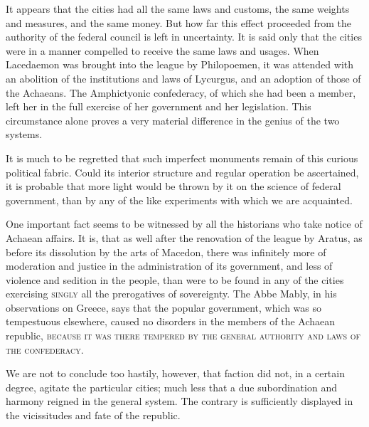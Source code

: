 It appears that the cities had all the same laws and customs, the same weights and measures, and the same money. 
But how far this effect proceeded from the authority of the federal council is left in uncertainty. 
It is said only that the cities were in a manner compelled to receive the same laws and usages. 
When Lacedaemon was brought into the league by Philopoemen, it was attended with an abolition of the institutions and laws of Lycurgus, and an adoption of those of the Achaeans. 
The Amphictyonic confederacy, of which she had been a member, left her in the full exercise of her government and her legislation. 
This circumstance alone proves a very material difference in the genius of the two systems.

It is much to be regretted that such imperfect monuments remain of this curious political fabric. 
Could its interior structure and regular operation be ascertained, it is probable that more light would be thrown by it on the science of federal government, than by any of the like experiments with which we are acquainted.

One important fact seems to be witnessed by all the historians who take notice of Achaean affairs. 
It is, that as well after the renovation of the league by Aratus, as before its dissolution by the arts of Macedon, there was infinitely more of moderation and justice in the administration of its government, and less of violence and sedition in the people, than were to be found in any of the cities exercising \textsc{singly} all the prerogatives of sovereignty. 
The Abbe Mably, in his observations on Greece, says that the popular government, which was so tempestuous elsewhere, caused no disorders in the members of the Achaean republic, \textsc{because it was there tempered by the general authority and laws of the confederacy}.

We are not to conclude too hastily, however, that faction did not, in a certain degree, agitate the particular cities; much less that a due subordination and harmony reigned in the general system. 
The contrary is sufficiently displayed in the vicissitudes and fate of the republic.

